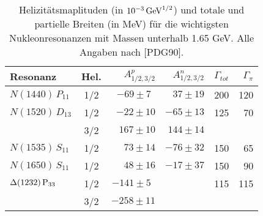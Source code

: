 \begin{table}
\caption{Helizit\"atsmaplituden (in $10^{-3}\,{\rm GeV}^{1/2}$) und
totale und partielle Breiten (in MeV) f\"ur die wichtigsten Nukleonresonanzen
mit Massen unterhalb 1.65 GeV. Alle Angaben nach [PDG90].}
\begin{center}
\begin{tabular}{|l||c|r|r|r|r|} \hline
  Resonanz             & Hel.  &  $A_{1/2,3/2}^p$ & $A_{1/2,3/2}^n$ 
		& $\Gamma_{tot}$ & $\Gamma_\pi$ \\ \hline\hline
 $N(1440)\,P_{11}$ & 1/2   &  $-69\pm 7\;\,$  & $37\pm 19$
                &  200         & 120   \\ 
 $N(1520)\,D_{13}$ & 1/2   &  $-22\pm 10$     & $-65\pm 13$
                &  125         &  70    \\
                       & 3/2   &  $167\pm 10$     & $144\pm 14$
		&              &        \\
 $N(1535)\,S_{11}$ & 1/2   &  $73\pm 14$      & $-76\pm 32$
                &  150         &   65    \\
 $N(1650)\,S_{11}$ & 1/2   &  $48\pm 16$      & $-17\pm 37$ 
                & 150	       &   90    \\
 $\Delta (1232)\,\rm P_{33}$ & 1/2 & $-141\pm 5\;\,$&
                &  115         &  115   \\
		        & 3/2  &  $-258\pm 11$    &          
		&              &        \\ \hline
\end{tabular}
\end{center}
\end{table}

